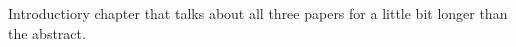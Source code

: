 Introductiory chapter that talks about all three papers for a little bit longer
than the abstract.

